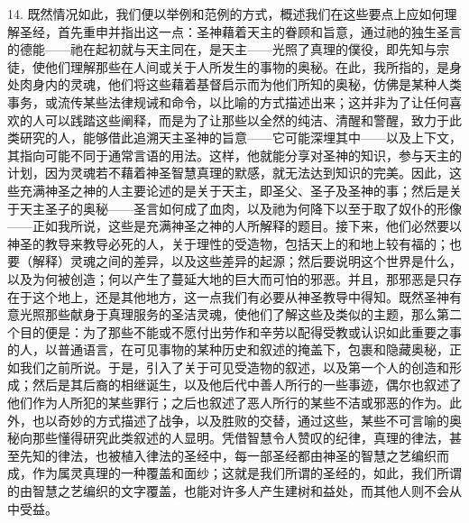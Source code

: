 14. 既然情况如此，我们便以举例和范例的方式，概述我们在这些要点上应如何理解圣经，首先重申并指出这一点：圣神藉着天主的眷顾和旨意，通过祂的独生圣言的德能——祂在起初就与天主同在，是天主——光照了真理的僕役，即先知与宗徒，使他们理解那些在人间或关于人所发生的事物的奥秘。在此，我所指的，是身处肉身内的灵魂，他们将这些藉着基督启示而为他们所知的奥秘，仿佛是某种人类事务，或流传某些法律规诫和命令，以比喻的方式描述出来；这并非为了让任何喜欢的人可以践踏这些阐释，而是为了让那些以全然的纯洁、清醒和警醒，致力于此类研究的人，能够借此追溯天主圣神的旨意——它可能深埋其中——以及上下文，其指向可能不同于通常言语的用法。这样，他就能分享对圣神的知识，参与天主的计划，因为灵魂若不藉着神圣智慧真理的默感，就无法达到知识的完美。因此，这些充满神圣之神的人主要论述的是关于天主，即圣父、圣子及圣神的事；然后是关于天主圣子的奥秘——圣言如何成了血肉，以及祂为何降下以至于取了奴仆的形像——正如我所说，这些是充满神圣之神的人所解释的题目。接下来，他们必然要以神圣的教导来教导必死的人，关于理性的受造物，包括天上的和地上较有福的；也要（解释）灵魂之间的差异，以及这些差异的起源；然后要说明这个世界是什么，以及为何被创造；何以产生了蔓延大地的巨大而可怕的邪恶。并且，那邪恶是只存在于这个地上，还是其他地方，这一点我们有必要从神圣教导中得知。既然圣神有意光照那些献身于真理服务的圣洁灵魂，使他们了解这些及类似的主题，那么第二个目的便是：为了那些不能或不愿付出劳作和辛劳以配得受教或认识如此重要之事的人，以普通语言，在可见事物的某种历史和叙述的掩盖下，包裹和隐藏奥秘，正如我们之前所说。于是，引入了关于可见受造物的叙述，以及第一个人的创造和形成；然后是其后裔的相继诞生，以及他后代中善人所行的一些事迹，偶尔也叙述了他们作为人所犯的某些罪行；之后也叙述了恶人所行的某些不洁或邪恶的作为。此外，也以奇妙的方式描述了战争，以及胜败的交替，通过这些，某些不可言喻的奥秘向那些懂得研究此类叙述的人显明。凭借智慧令人赞叹的纪律，真理的律法，甚至先知的律法，也被植入律法的圣经中，每一部圣经都由神圣的智慧之艺编织而成，作为属灵真理的一种覆盖和面纱；这就是我们所谓的圣经的，如此，我们所谓的由智慧之艺编织的文字覆盖，也能对许多人产生建树和益处，而其他人则不会从中受益。\par

